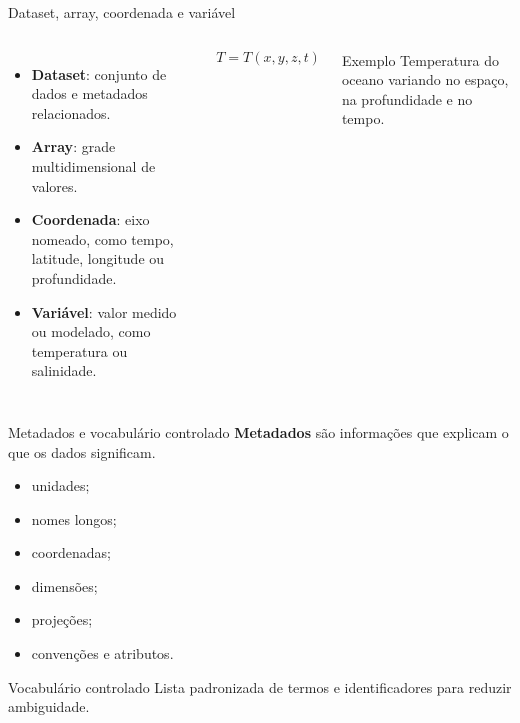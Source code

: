 \documentclass[aspectratio=169]{beamer}
\begin{document}
\begin{frame}{Dataset, array, coordenada e variável}
\begin{columns}
\begin{itemize}
  \item \textbf{Dataset}: conjunto de dados e metadados relacionados.
  \item \textbf{Array}: grade multidimensional de valores.
  \item \textbf{Coordenada}: eixo nomeado, como tempo, latitude, longitude ou profundidade.
  \item \textbf{Variável}: valor medido ou modelado, como temperatura ou salinidade.
\end{itemize}

\Large
\[
T = T(x, y, z, t)
\]

\vspace{0.3cm}

\begin{block}{Exemplo}
Temperatura do oceano variando no espaço, na profundidade e no tempo.
\end{block}
\end{columns}
\end{frame}

\begin{frame}{Metadados e vocabulário controlado}
\Large
\textbf{Metadados} são informações que explicam o que os dados significam.

\vspace{0.3cm}

\begin{itemize}
  \item unidades;
  \item nomes longos;
  \item coordenadas;
  \item dimensões;
  \item projeções;
  \item convenções e atributos.
\end{itemize}

\vspace{0.3cm}

\begin{block}{Vocabulário controlado}
Lista padronizada de termos e identificadores para reduzir ambiguidade.
\end{block}
\end{frame}
\end{document}
